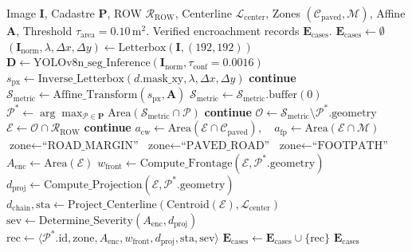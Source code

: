 \documentclass[conference]{IEEEtran}
\begin{document}
\begin{algorithm}[!t]
\caption{Automated Spatial Road ROW Compliance Analysis}
\label{alg:encroachment}
\footnotesize
\begin{algorithmic}[1]
\REQUIRE Image $\mathbf{I}$, Cadastre $\mathbf{P}$, ROW $\mathcal{R}_{\text{ROW}}$, Centerline $\mathcal{L}_{\text{center}}$, Zones $(\mathcal{C}_{\text{paved}}, \mathcal{M})$, Affine $\mathbf{A}$, Threshold $\tau_{\text{area}} = 0.10\,\text{m}^2$.
\ENSURE Verified encroachment records $\mathbf{E}_{\text{cases}}$.
\STATE $\mathbf{E}_{\text{cases}} \leftarrow \emptyset$
\STATE $(\mathbf{I}_{\text{norm}}, \lambda, \Delta x, \Delta y) \leftarrow \text{Letterbox}(\mathbf{I}, (192, 192))$
\STATE $\mathbf{D} \leftarrow \text{YOLOv8n\_seg\_Inference}(\mathbf{I}_{\text{norm}}, \tau_{\text{conf}}=0.0016)$
    \STATE $s_{\text{px}} \leftarrow \text{Inverse\_Letterbox}(d.\text{mask\_xy}, \lambda, \Delta x, \Delta y)$
     \textbf{continue} \ENDIF
    \STATE $\mathcal{S}_{\text{metric}} \leftarrow \text{Affine\_Transform}(s_{\text{px}}, \mathbf{A})$
     $\mathcal{S}_{\text{metric}} \leftarrow \mathcal{S}_{\text{metric}}.\text{buffer}(0)$ \ENDIF
    \STATE $\mathcal{P}^* \leftarrow \arg\max_{\mathcal{P} \in \mathbf{P}} \text{Area}(\mathcal{S}_{\text{metric}} \cap \mathcal{P})$
     \textbf{continue} \ENDIF
    \STATE $\mathcal{O} \leftarrow \mathcal{S}_{\text{metric}} \setminus \mathcal{P}^*.\text{geometry}$
    \STATE $\mathcal{E} \leftarrow \mathcal{O} \cap \mathcal{R}_{\text{ROW}}$
     \textbf{continue} \ENDIF
    \STATE $a_{\text{cw}} \leftarrow \text{Area}(\mathcal{E} \cap \mathcal{C}_{\text{paved}}), \quad a_{\text{fp}} \leftarrow \text{Area}(\mathcal{E} \cap \mathcal{M})$
        \STATE $\text{zone} \leftarrow \text{``ROAD\_MARGIN''}$
        \STATE $\text{zone} \leftarrow \text{``PAVED\_ROAD''}$
    \ELSE
        \STATE $\text{zone} \leftarrow \text{``FOOTPATH''}$
    \ENDIF
    \STATE $A_{\text{enc}} \leftarrow \text{Area}(\mathcal{E})$
    \STATE $w_{\text{front}} \leftarrow \text{Compute\_Frontage}(\mathcal{E}, \mathcal{P}^*.\text{geometry})$
    \STATE $d_{\text{proj}} \leftarrow \text{Compute\_Projection}(\mathcal{E}, \mathcal{P}^*.\text{geometry})$
    \STATE $d_{\text{chain}}, \text{sta} \leftarrow \text{Project\_Centerline}(\text{Centroid}(\mathcal{E}), \mathcal{L}_{\text{center}})$
    \STATE $\text{sev} \leftarrow \text{Determine\_Severity}(A_{\text{enc}}, d_{\text{proj}})$
    \STATE $\text{rec} \leftarrow \langle \mathcal{P}^*.\text{id}, \text{zone}, A_{\text{enc}}, w_{\text{front}}, d_{\text{proj}}, \text{sta}, \text{sev} \rangle$
    \STATE $\mathbf{E}_{\text{cases}} \leftarrow \mathbf{E}_{\text{cases}} \cup \{\text{rec}\}$
\ENDFOR
\RETURN $\mathbf{E}_{\text{cases}}$
\end{algorithmic}
\end{algorithm}
\end{document}
